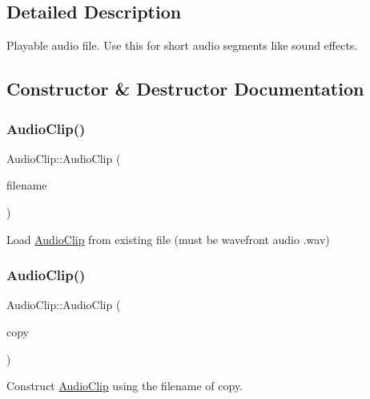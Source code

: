 \subsection{Detailed Description}
Playable audio file. Use this for short audio segments like sound effects. 

\subsection{Constructor \& Destructor Documentation}
\mbox{\label{class_audio_clip_a92cb3dceab020f54290b05b1ae5de974}} 
\subsubsection{\texorpdfstring{Audio\+Clip()}{AudioClip()}\hspace{0.1cm}{\footnotesize\ttfamily [1/3]}}
{\footnotesize\ttfamily Audio\+Clip\+::\+Audio\+Clip (\begin{DoxyParamCaption}\item[{std\+::string}]{filename }\end{DoxyParamCaption})}

Load \mbox{\hyperlink{class_audio_clip}{Audio\+Clip}} from existing file (must be wavefront audio .wav) \mbox{\label{class_audio_clip_ac5664fc84d17e5e31c1daacdec89b3cf}} 
\subsubsection{\texorpdfstring{Audio\+Clip()}{AudioClip()}\hspace{0.1cm}{\footnotesize\ttfamily [2/3]}}
{\footnotesize\ttfamily Audio\+Clip\+::\+Audio\+Clip (\begin{DoxyParamCaption}\item[{const \mbox{\hyperlink{class_audio_clip}{Audio\+Clip}} \&}]{copy }\end{DoxyParamCaption})}

Construct \mbox{\hyperlink{class_audio_clip}{Audio\+Clip}} using the filename of copy. \mbox{\label{class_audio_clip_a0a4d351823548e0f54625c37db221c82}} 
